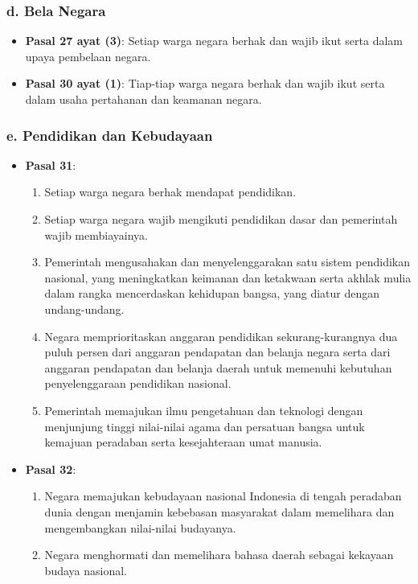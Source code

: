 \subsubsection{d. Bela Negara}
\begin{itemize}
    \item \textbf{Pasal 27 ayat (3)}: Setiap warga negara berhak dan wajib ikut serta dalam upaya pembelaan negara.
    \item \textbf{Pasal 30 ayat (1)}: Tiap-tiap warga negara berhak dan wajib ikut serta dalam usaha pertahanan dan keamanan negara.
\end{itemize}

\subsubsection{e. Pendidikan dan Kebudayaan}
\begin{itemize}
    \item \textbf{Pasal 31}:
    \begin{enumerate}
        \item Setiap warga negara berhak mendapat pendidikan.
        \item Setiap warga negara wajib mengikuti pendidikan dasar dan pemerintah wajib membiayainya.
        \item Pemerintah mengusahakan dan menyelenggarakan satu sistem pendidikan nasional, yang meningkatkan keimanan dan ketakwaan serta akhlak mulia dalam rangka mencerdaskan kehidupan bangsa, yang diatur dengan undang-undang.
        \item Negara memprioritaskan anggaran pendidikan sekurang-kurangnya dua puluh persen dari anggaran pendapatan dan belanja negara serta dari anggaran pendapatan dan belanja daerah untuk memenuhi kebutuhan penyelenggaraan pendidikan nasional.
        \item Pemerintah memajukan ilmu pengetahuan dan teknologi dengan menjunjung tinggi nilai-nilai agama dan persatuan bangsa untuk kemajuan peradaban serta kesejahteraan umat manusia.
    \end{enumerate}
    \item \textbf{Pasal 32}:
    \begin{enumerate}
        \item Negara memajukan kebudayaan nasional Indonesia di tengah peradaban dunia dengan menjamin kebebasan masyarakat dalam memelihara dan mengembangkan nilai-nilai budayanya.
        \item Negara menghormati dan memelihara bahasa daerah sebagai kekayaan budaya nasional.
    \end{enumerate}
\end{itemize}

